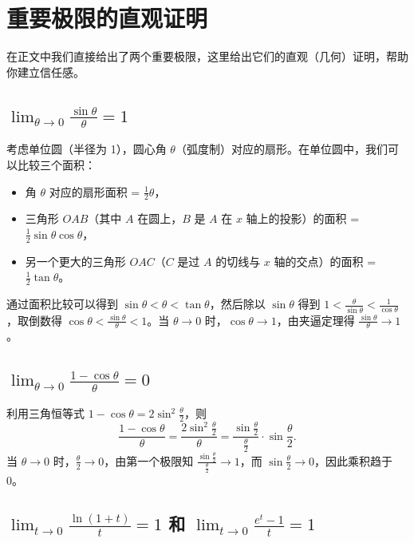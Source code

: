 \documentclass[10pt]{article}
\begin{document}
\section{重要极限的直观证明}

在正文中我们直接给出了两个重要极限，这里给出它们的直观（几何）证明，帮助你建立信任感。

\subsection{$\displaystyle \lim_{\theta \to 0} \frac{\sin\theta}{\theta} = 1$}

考虑单位圆（半径为 1），圆心角 $\theta$（弧度制）对应的扇形。在单位圆中，我们可以比较三个面积：
\begin{itemize}
    \item 角 $\theta$ 对应的扇形面积 = $\frac{1}{2}\theta$，
    \item 三角形 $OAB$（其中 $A$ 在圆上，$B$ 是 $A$ 在 $x$ 轴上的投影）的面积 = $\frac{1}{2}\sin\theta \cos\theta$，
    \item 另一个更大的三角形 $OAC$（$C$ 是过 $A$ 的切线与 $x$ 轴的交点）的面积 = $\frac{1}{2}\tan\theta$。
\end{itemize}
通过面积比较可以得到 $\sin\theta < \theta < \tan\theta$，然后除以 $\sin\theta$ 得到 $1 < \frac{\theta}{\sin\theta} < \frac{1}{\cos\theta}$，取倒数得 $\cos\theta < \frac{\sin\theta}{\theta} < 1$。当 $\theta \to 0$ 时，$\cos\theta \to 1$，由夹逼定理得 $\frac{\sin\theta}{\theta} \to 1$。

\subsection{$\displaystyle \lim_{\theta \to 0} \frac{1-\cos\theta}{\theta} = 0$}

利用三角恒等式 $1-\cos\theta = 2\sin^2\frac{\theta}{2}$，则
$$
\frac{1-\cos\theta}{\theta} = \frac{2\sin^2\frac{\theta}{2}}{\theta} = \frac{\sin\frac{\theta}{2}}{\frac{\theta}{2}} \cdot \sin\frac{\theta}{2}.
$$
当 $\theta \to 0$ 时，$\frac{\theta}{2} \to 0$，由第一个极限知 $\frac{\sin\frac{\theta}{2}}{\frac{\theta}{2}} \to 1$，而 $\sin\frac{\theta}{2} \to 0$，因此乘积趋于 0。

\subsection{$\displaystyle \lim_{t \to 0} \frac{\ln(1+t)}{t} = 1$ 和 $\displaystyle \lim_{t \to 0} \frac{e^t - 1}{t} = 1$}
\end{document}
